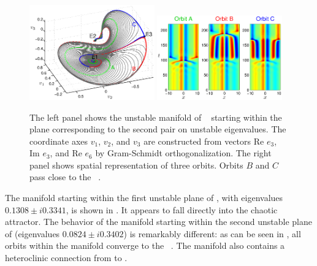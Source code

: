 \begin{figure}[t]
\begin{center}
\includegraphics[width=0.48\textwidth]{figs/ks22_E1_plane2_manifold.eps}
\includegraphics[width=0.48\textwidth]{figs/ks22_E1_plane2_orbits.eps}
\end{center}
\caption{
The left panel shows the unstable
manifold of \eqv\  starting within the plane
corresponding to the second pair on unstable eigenvalues. The
coordinate axes $v_1$, $v_2$, and $v_3$ are constructed from vectors
Re $e_3$, Im $e_3$, and Re $e_6$ by Gram-Schmidt orthogonalization.
The right panel shows spatial representation of three orbits. Orbits
$B$ and $C$ pass close to the \eqv\ .
   }
\label{f:KS22E1man2}
\end{figure}

The manifold starting within the first unstable plane of , with
eigenvalues $0.1308\pm i0.3341$, is shown in
. It appears to fall directly into the
chaotic attractor.  The behavior of the manifold starting within
the second unstable plane of  (eigenvalues $0.0824\pm i0.3402$) is
remarkably different: as can be seen in ,
all orbits within the manifold converge to the \eqv\ .  The
manifold also contains a heteroclinic connection from  to .

